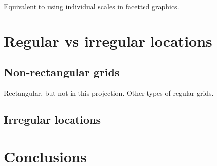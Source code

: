 \documentclass[oneside]{article}
\begin{document}
Equivalent to using individual scales in facetted graphics.


\section{Regular vs irregular locations}

\subsection{Non-rectangular grids}

Rectangular, but not in this projection.  Other types of regular grids.

\subsection{Irregular locations}

\section{Conclusions}


\end{document}
